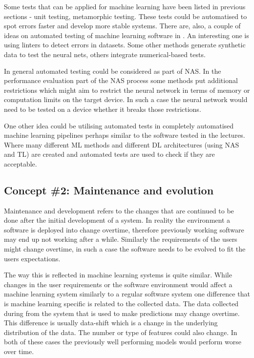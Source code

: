 \documentclass[11pt,a4paper]{article}
\begin{document}
Some tests that can be applied for machine learning have been listed in previous sections - unit testing, metamorphic testing. These tests could be automatised to spot errors faster and develop more stable systems. There are, also, a couple of ideas on automated testing of machine learning software in \cite{testing}. An interesting one is using linters to detect errors in datasets. Some other methods generate synthetic data to test the neural nets, others integrate numerical-based tests.

In general automated testing could be considered as part of NAS. In the performance evaluation part of the NAS process some methods put additional restrictions which might aim to restrict the neural network in terms of memory or computation limits on the target device. In such a case the neural network would need to be tested on a device whether it breaks those restrictions.

One other idea could be utilising automated tests in completely automatised machine learning pipelines perhaps similar to the software tested in the lectures. Where many different ML methods and different DL architectures (using NAS and TL) are created and automated tests are used to check if they are acceptable.


\subsection*{Concept \#2: Maintenance and evolution}
Maintenance and development refers to the changes that are continued to be done after the initial development of a system. In reality the environment a software is deployed into change overtime, therefore previously working software may end up not working after a while. Similarly the requirements of the users might change overtime, in such a case the software needs to be evolved to fit the users expectations.

The way this is reflected in machine learning systems is quite similar. While changes in the user requirements or the software environment would affect a machine learning system similarly to a regular software system one difference that is machine learning specific is related to the collected data. The data collected during from the system that is used to make predictions may change overtime. This difference is usually data-shift which is a change in the underlying distribution of the data. The number or type of features could also change. In both of these cases the previously well performing models would perform worse over time.
\end{document}
